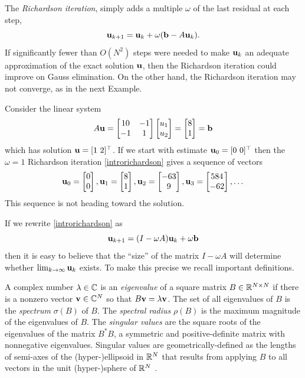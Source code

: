 The \emph{Richardson iteration}, simply adds a multiple $\omega$ of the last residual at each step,
\begin{equation}
\mathbf{u}_{k+1} = \mathbf{u}_k + \omega (\mathbf{b} - A \mathbf{u}_k).  \label{introrichardson}
\end{equation}
If significantly fewer than $O(N^2)$ steps were needed to make $\mathbf{u}_k$ an adequate approximation of the exact solution $\mathbf{u}$, then the Richardson iteration could improve on Gauss elimination.  On the other hand, the Richardson iteration may not converge, as in the next Example.

\medskip\noindent\hrulefill
\begin{example} Consider the linear system
\begin{equation}
A \mathbf{u}
= \begin{bmatrix}
10 & -1 \\ -1 & 1
\end{bmatrix}
\begin{bmatrix} u_1 \\ u_2 \end{bmatrix}
= \begin{bmatrix} 8 \\ 1 \end{bmatrix}
= \mathbf{b}
 \label{introexample}
\end{equation}
which has solution $\mathbf{u} = [1\,\, 2]^\top$.  If we start with estimate $\mathbf{u}_0 = [0\,\, 0]^\top$ then the $\omega=1$ Richardson iteration \eqref{introrichardson} gives a sequence of vectors %
\begin{equation}
{\mathbf{u}}_{0} = \begin{bmatrix} 0 \\ 0 \end{bmatrix}, {\mathbf{u}}_{1} = \begin{bmatrix} 8 \\ 1 \end{bmatrix}, {\mathbf{u}}_{2} = \begin{bmatrix} -63 \\ 9 \end{bmatrix}, {\mathbf{u}}_{3} = \begin{bmatrix} 584 \\ -62 \end{bmatrix}, \dots
\end{equation}
This sequence is not heading toward the solution.
\end{example}
\noindent\hrulefill

\medskip
If we rewrite \eqref{introrichardson} as
\begin{equation}
\mathbf{u}_{k+1} = (I - \omega A) \mathbf{u}_k + \omega \mathbf{b}  \label{introrewriterichardson}
\end{equation}
then it is easy to believe that the ``size'' of the matrix $I-\omega A$ will determine whether $\lim_{k\to\infty} \mathbf{u}_k$ exists.  To make this precise we recall important definitions.

A complex number $\lambda \in \mathbb{C}$ is an \emph{eigenvalue} of a square matrix $B\in\mathbb{R}^{N\times N}$ if there is a nonzero vector $\mathbf{v}\in\mathbb{C}^N$ so that $B \mathbf{v} = \lambda \mathbf{v}$.  The set of all eigenvalues of $B$ is the \emph{spectrum} $\sigma(B)$ of $B$.  The \emph{spectral radius} $\rho(B)$ is the maximum magnitude of the eigenvalues of $B$.  The \emph{singular values} are the square roots of the eigenvalues of the matrix $B^*B$, a symmetric and positive-definite matrix with nonnegative eigenvalues.  Singular values are geometrically-defined as the lengths of semi-axes of the (hyper-)ellipsoid in $\mathbb{R}^N$ that results from applying $B$ to all vectors in the unit (hyper-)sphere of $\mathbb{R}^N$ \citep{TrefethenBau1997}.

